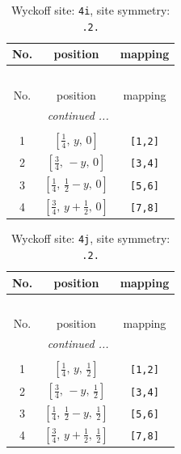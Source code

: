 \documentclass[fleqn,8pt]{jsarticle}
\begin{document}
\renewcommand{\arraystretch}{1.2}
\begin{longtable}{ccc}
\caption{Wyckoff site: {\tt 4i}, site symmetry: {\tt .2.}}
 \\
 \hline \hline
No. & position & mapping \\ \hline \endfirsthead

\multicolumn{2}{l}{\tablename\ \thetable{}} \\
 \hline \hline
No. & position & mapping \\ \hline \endhead

 \hline \hline
\multicolumn{2}{r}{\footnotesize\it continued ...} \\ \endfoot

 \hline \hline
\multicolumn{2}{r}{} \\ \endlastfoot

1 & $\left[ \frac{1}{4},\, y,\, 0 \right]$ & {\tt [1,2]} \\ \hline
2 & $\left[ \frac{3}{4},\, - y,\, 0 \right]$ & {\tt [3,4]} \\ \hline
3 & $\left[ \frac{1}{4},\, \frac{1}{2} - y,\, 0 \right]$ & {\tt [5,6]} \\ \hline
4 & $\left[ \frac{3}{4},\, y + \frac{1}{2},\, 0 \right]$ & {\tt [7,8]} \\
\end{longtable}
\renewcommand{\arraystretch}{1.2}
\begin{longtable}{ccc}
\caption{Wyckoff site: {\tt 4j}, site symmetry: {\tt .2.}}
 \\
 \hline \hline
No. & position & mapping \\ \hline \endfirsthead

\multicolumn{2}{l}{\tablename\ \thetable{}} \\
 \hline \hline
No. & position & mapping \\ \hline \endhead

 \hline \hline
\multicolumn{2}{r}{\footnotesize\it continued ...} \\ \endfoot

 \hline \hline
\multicolumn{2}{r}{} \\ \endlastfoot

1 & $\left[ \frac{1}{4},\, y,\, \frac{1}{2} \right]$ & {\tt [1,2]} \\ \hline
2 & $\left[ \frac{3}{4},\, - y,\, \frac{1}{2} \right]$ & {\tt [3,4]} \\ \hline
3 & $\left[ \frac{1}{4},\, \frac{1}{2} - y,\, \frac{1}{2} \right]$ & {\tt [5,6]} \\ \hline
4 & $\left[ \frac{3}{4},\, y + \frac{1}{2},\, \frac{1}{2} \right]$ & {\tt [7,8]} \\
\end{longtable}
\end{document}
